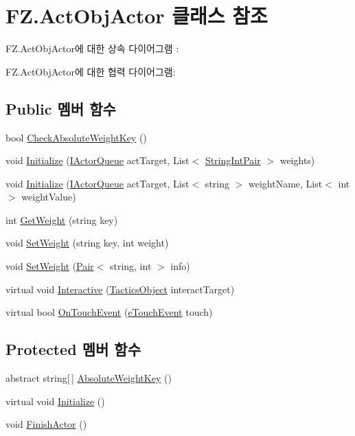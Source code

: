 \hypertarget{class_f_z_1_1_act_obj_actor}{}\section{F\+Z.\+Act\+Obj\+Actor 클래스 참조}
\label{class_f_z_1_1_act_obj_actor}


F\+Z.\+Act\+Obj\+Actor에 대한 상속 다이어그램 \+: 


F\+Z.\+Act\+Obj\+Actor에 대한 협력 다이어그램\+:
\subsection*{Public 멤버 함수}
\begin{DoxyCompactItemize}
\item 
bool \hyperlink{class_f_z_1_1_actor_aa78fa8d765cfc56474c3714d38bcc13b}{Check\+Absolute\+Weight\+Key} ()
\item 
void \hyperlink{class_f_z_1_1_actor_ac29de02b4c3cc1012143f6531f5809ed}{Initialize} (\hyperlink{interface_f_z_1_1_i_actor_queue}{I\+Actor\+Queue} act\+Target, List$<$ \hyperlink{class_f_z_1_1_string_int_pair}{String\+Int\+Pair} $>$ weights)
\item 
void \hyperlink{class_f_z_1_1_actor_a968a8b42fa52f121bdcc9c8ea8136eb9}{Initialize} (\hyperlink{interface_f_z_1_1_i_actor_queue}{I\+Actor\+Queue} act\+Target, List$<$ string $>$ weight\+Name, List$<$ int $>$ weight\+Value)
\item 
int \hyperlink{class_f_z_1_1_actor_ab6dee08c1296f3c020694fd9408b7c33}{Get\+Weight} (string key)
\item 
void \hyperlink{class_f_z_1_1_actor_a0f36cb598cc81fc94bf5de590382004e}{Set\+Weight} (string key, int weight)
\item 
void \hyperlink{class_f_z_1_1_actor_a6c257b538187513e247b92905da53954}{Set\+Weight} (\hyperlink{class_f_z_1_1_pair}{Pair}$<$ string, int $>$ info)
\item 
virtual void \hyperlink{class_f_z_1_1_actor_a1d5780d31a35893d38598d78c8f0c74a}{Interactive} (\hyperlink{class_tactics_object}{Tactics\+Object} interact\+Target)
\item 
virtual bool \hyperlink{class_f_z_1_1_actor_a9f30b12f3615a447df054d48ef4e22c7}{On\+Touch\+Event} (\hyperlink{_touch_manager_8cs_ae33e321a424fe84ba8b2fdb81ad40a68}{e\+Touch\+Event} touch)
\end{DoxyCompactItemize}
\subsection*{Protected 멤버 함수}
\begin{DoxyCompactItemize}
\item 
abstract string\mbox{[}$\,$\mbox{]} \hyperlink{class_f_z_1_1_actor_aade2d1f3a48ea90fe361a2e0e3ff9985}{Absolute\+Weight\+Key} ()
\item 
virtual void \hyperlink{class_f_z_1_1_actor_a57abd0487ac5f6b273d1a9e06b3087ef}{Initialize} ()
\item 
void \hyperlink{class_f_z_1_1_actor_a26e516ab18ada56bb6a9e26c8fd6b709}{Finish\+Actor} ()
\end{DoxyCompactItemize}
